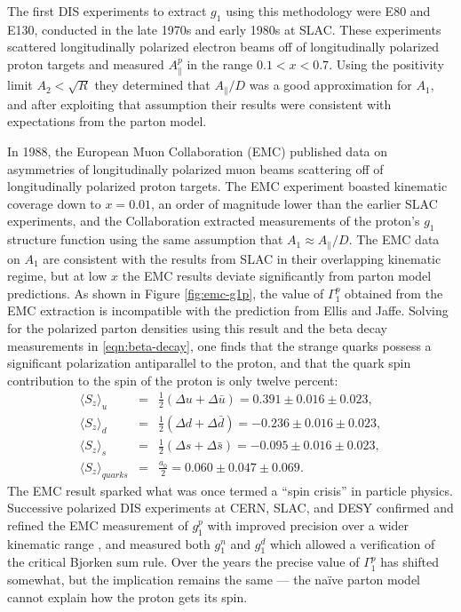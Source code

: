 The first DIS experiments to extract $g_1$ using this methodology were E80 and
E130, conducted in the late 1970s and early 1980s at SLAC. These experiments
scattered longitudinally polarized electron beams off of longitudinally
polarized proton targets and measured $A_{\parallel}^p$ in the range $0.1 < x <
0.7$. Using the positivity limit $A_2 < \sqrt{R}$ they determined that
$A_{\parallel}/D$ was a good approximation for $A_1$, and after exploiting that
assumption their results \cite{Alguard:1976bm, Baum:1983ha} were consistent with
expectations from the parton model.

In 1988, the European Muon Collaboration (EMC) published data on asymmetries of
longitudinally polarized muon beams scattering off of longitudinally polarized
proton targets. The EMC experiment boasted kinematic coverage down to $x =
0.01$, an order of magnitude lower than the earlier SLAC experiments, and the
Collaboration extracted measurements of the proton's $g_1$ structure function
using the same assumption that $A_1 \approx A_{\parallel}/D$. The EMC data on
$A_1$ are consistent with the results from SLAC in their overlapping kinematic
regime, but at low $x$ the EMC results deviate significantly from parton model
predictions. As shown in Figure \ref{fig:emc-g1p}, the value of $\Gamma_1^p$
obtained from the EMC extraction is incompatible with the prediction from Ellis
and Jaffe. Solving for the polarized parton densities using this result and the
beta decay measurements in \ref{eqn:beta-decay}, one finds that the strange
quarks possess a significant polarization antiparallel to the proton, and that
the quark spin contribution to the spin of the proton is only twelve percent:
%
\begin{eqnarray}
  \langle S_z \rangle_{u} &=& \frac{1}{2}\left(\Delta u + \Delta \bar{u}\right) = 0.391 \pm 0.016 \pm 0.023, \nonumber \\
  \langle S_z \rangle_{d} &=& \frac{1}{2}\left(\Delta d + \Delta \bar{d}\right) = -0.236 \pm 0.016 \pm 0.023, \nonumber \\
  \langle S_z \rangle_{s} &=& \frac{1}{2}\left(\Delta s + \Delta \bar{s}\right) = -0.095 \pm 0.016 \pm 0.023, \nonumber \\
  \langle S_z \rangle_{quarks} &=& \frac{a_0}{2} = 0.060 \pm 0.047 \pm 0.069.
\end{eqnarray}
%
The EMC result sparked what was once termed a ``spin crisis'' in particle
physics. Successive polarized DIS experiments at CERN, SLAC, and DESY confirmed
and refined the EMC measurement of \(g_1^p\) with improved precision over a
wider kinematic range \cite{Adams:1994zd}, and measured both \(g_1^n\)
\cite{Anthony:1993uf} and \(g_1^d\) \cite{Adeva:1993km} which allowed a
verification of the critical Bjorken sum rule. Over the years the precise value
of \(\Gamma_1^p\) has shifted somewhat, but the implication remains the same ---
the na\"ive parton model cannot explain how the proton gets its spin.

